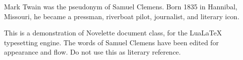 \documentclass[../demo.tex]{novelette-subdoc}
\begin{document}
\begin{opening}
\null\null\null
\null\null
\end{opening}
\begin{blockindent}[3,3]
Mark Twain was the pseudonym of Samuel Clemens. Born 1835 in Hannibal,
Missouri, he became a pressman, riverboat pilot, journalist,
and literary icon.\par
\null\null
\noindent This is a demonstration of Novelette document
class, for the LuaLaTeX typesetting engine.
The words of Samuel Clemens have been edited for appearance and flow.
Do not use this as literary reference.\par
\end{blockindent}
\end{document}
